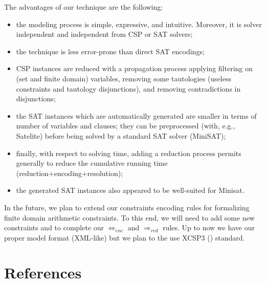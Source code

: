 \documentclass[3p,authoryear,times]{elsarticle}
\newcommand{\rmin}[0]{{\Rightarrow_{red}}}
\newcommand{\enc}[0]{\Leftrightarrow_{enc}}
\begin{document}
The advantages of our technique are the following:
\begin{itemize}
\item the modeling process is simple, expressive, and intuitive. Moreover, it is solver independent and independent from CSP or SAT solvers;
\item the technique is less error-prone than direct SAT encodings; 
\item CSP instances are reduced with a propagation process applying filtering on (set and finite domain) variables, removing some tautologies (useless constraints and tautology disjunctions), and removing contradictions in disjunctions;
\item the SAT instances which are automatically generated are smaller in terms of number of variables and clauses; they can be preprocessed (with, e.g., Satelite) before being solved by a standard SAT solver (MiniSAT);
\item finally, with respect to solving time, adding a reduction process permits generally to reduce the cumulative running time (reduction+encoding+resolution);
\item the generated SAT instances also appeared to be well-suited for Minisat.
\end{itemize}


In the future, we plan to extend our constraints encoding rules for formalizing finite domain arithmetic constraints. To this end,
we will need to add some new constraints and to complete our $\enc$ and $\rmin$  rules.  Up to now we have our proper model format (XML-like) but we plan to the use XCSP3 (\cite{xcsp3}) standard.
\color{black}

\section*{References}


\end{document}
